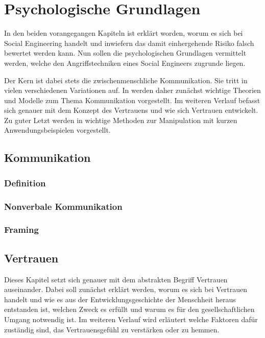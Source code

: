 \section{Psychologische Grundlagen}\label{sec:psychologische_grundlagen}

In den beiden vorangegangen Kapiteln ist erklärt worden, worum es sich bei Social Engineering handelt und inwiefern das damit einhergehende Risiko falsch bewertet werden kann. Nun sollen die psychologischen Grundlagen vermittelt werden, welche den Angriffstechniken eines Social Engineers zugrunde liegen.

Der Kern ist dabei stets die zwischenmenschliche Kommunikation. Sie tritt in vielen verschiedenen Variationen
auf. In  werden daher zunächst wichtige Theorien und Modelle zum Thema Kommunikation vorgestellt. Im weiteren Verlauf befasst sich  genauer mit dem Konzept des Vertrauens und wie sich Vertrauen entwickelt. Zu guter Letzt werden in  wichtige Methoden zur Manipulation mit kurzen Anwendungsbeispielen vorgestellt.

\subsection{Kommunikation}\label{sec:kommunikation}

\subsubsection{Definition}

\subsubsection{Nonverbale Kommunikation}

\subsubsection{Framing}

\subsection{Vertrauen}\label{sec:vertrauen}
Dieses Kapitel setzt sich genauer mit dem abstrakten Begriff Vertrauen auseinander. Dabei soll zunächst erklärt werden, worum es sich bei Vertrauen handelt und wie es aus der Entwicklungsgeschichte der Menschheit heraus entstanden ist, welchen Zweck es erfüllt und warum es für den gesellschaftlichen Umgang notwendig ist.
Im weiteren Verlauf wird erläutert welche Faktoren dafür zuständig sind, das Vertrauensgefühl zu verstärken oder zu hemmen.

